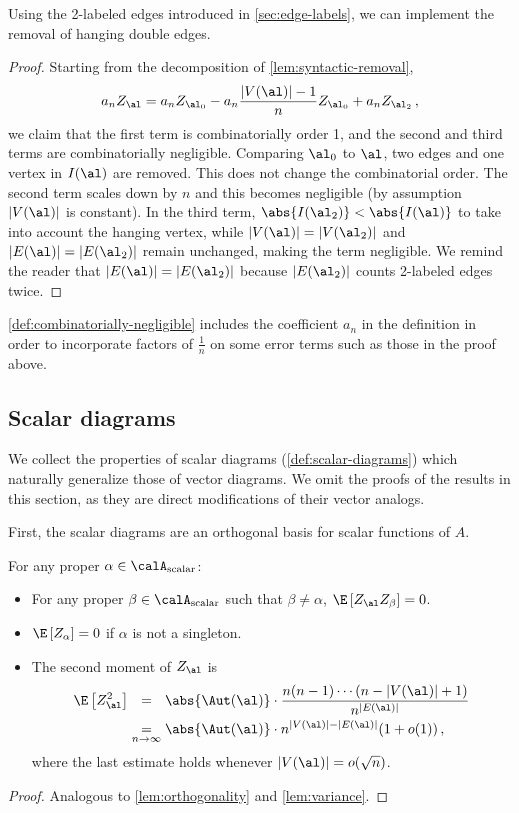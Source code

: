 \documentclass[12pt]{article}
\newcommand{\scalar}{\textnormal{scalar}}
\begin{document}
Using the 2-labeled edges introduced in \cref{sec:edge-labels}, we can
implement the removal of hanging double edges.
\removeDoubleEdge*
\begin{proof}
    Starting from the decomposition of \cref{lem:syntactic-removal},
    \[
        a_n Z_\al = a_n Z_{\al_0} - a_n \frac{|V(\al)| - 1}{n} Z_{\al_0} + a_n Z_{\al_2}\,,
    \]
    we claim that the first term is combinatorially order 1, and the second and third terms are combinatorially negligible.
    Comparing $\al_0$ to $\al$, two edges and one vertex in $I(\al)$ are removed.
    This does not change the combinatorial order.
    The second term scales down by $n$ and this becomes
    negligible (by assumption $|V(\al)|$ is constant).
    In the third term, $\abs{I(\al_2)} < \abs{I(\al)}$ to take into account the hanging vertex, while $|V(\al)| = |V(\al_2)|$ and $|E(\al)| = |E(\al_2)|$
    remain unchanged, making the
    term negligible.
    We remind the reader that $|E(\al)| = |E(\al_2)|$ because $|E(\al_2)|$
    counts 2-labeled edges twice.
\end{proof}

\cref{def:combinatorially-negligible}
includes the coefficient $a_n$ in the definition in order
to incorporate factors of $\frac 1 n$ on some error terms such as those in the proof above.
 
\subsection{Scalar diagrams}
\label{sec:scalar-diagrams}

We collect the properties of scalar diagrams (\cref{def:scalar-diagrams}) which naturally generalize those of vector diagrams.
We omit the proofs of the results in this section, as they are direct modifications of their vector analogs.

    First, the scalar diagrams are an orthogonal basis for scalar functions of $A$.
    \begin{lemma}
        For any proper $\alpha\in\calA_{\scalar}$:
        \begin{itemize}
            \item For any proper $\beta\in\calA_{\scalar}$ such that $\beta\neq \alpha$, $\E\left[Z_\al Z_\beta\right] = 0$.
            \item $\E \left[Z_\alpha\right]=0$ if $\alpha$ is not a singleton.
            \item The second moment of $Z_\al$ is
            \begin{align*}
                \E\left[Z_\al^2\right] &\underset{\phantom{n\to\infty}}{=} \abs{\Aut(\al)} \cdot \frac{n(n-1)\cdots(n-|V(\al)|+1)}{n^{|E(\al)|}} \\
                &\underset{n\to\infty}{=} \abs{\Aut(\al)} \cdot n^{|V(\al)|-|E(\al)|}(1+o(1))\,,
            \end{align*}
            where the last estimate holds whenever $|V(\al)|=o(\sqrt n)$.
        \end{itemize}
    \end{lemma}
    \begin{proof}
        Analogous to \cref{lem:orthogonality} and \cref{lem:variance}.
    \end{proof}
    
\end{document}
